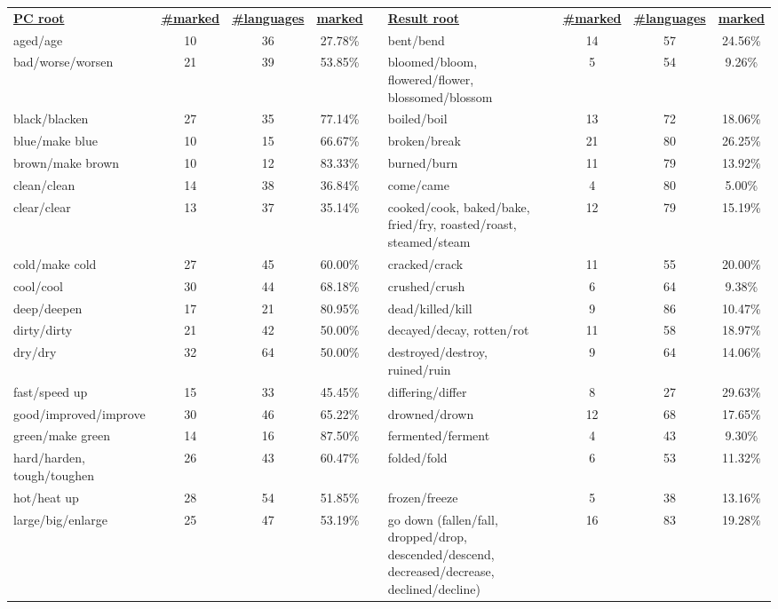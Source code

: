\begin{tabular}{p{3cm}ccccp{3cm}ccc}
\underline{\textbf{PC root}} & \underline{\textbf{\#marked}} & \underline{\textbf{\#languages}} & \underline{\textbf{marked}} & & \underline{\textbf{Result root}} & \underline{\textbf{\#marked}} & \underline{\textbf{\#languages}} & \underline{\textbf{marked}} \\
aged/age & 10 & 36 & 27.78\% & & bent/bend & 14 & 57 & 24.56\% \\
bad/worse/worsen & 21 & 39 & 53.85\% & & bloomed/bloom, flowered/flower, blossomed/blossom & 5 & 54 & 9.26\% \\
black/blacken & 27 & 35 & 77.14\% & & boiled/boil & 13 & 72 & 18.06\% \\
blue/make blue & 10 & 15 & 66.67\% & & broken/break & 21 & 80 & 26.25\% \\
brown/make brown & 10 & 12 & 83.33\% & & burned/burn & 11 & 79 & 13.92\% \\
clean/clean & 14 & 38 & 36.84\% & & come/came & 4 & 80 & 5.00\% \\
clear/clear & 13 & 37 & 35.14\% & & cooked/cook, baked/bake, fried/fry, roasted/roast, steamed/steam & 12 & 79 & 15.19\% \\
cold/make cold & 27 & 45 & 60.00\% & & cracked/crack & 11 & 55 & 20.00\% \\
cool/cool & 30 & 44 & 68.18\% & & crushed/crush & 6 & 64 & 9.38\% \\
deep/deepen & 17 & 21 & 80.95\% & & dead/killed/kill & 9 & 86 & 10.47\% \\
dirty/dirty & 21 & 42 & 50.00\% & & decayed/decay, rotten/rot & 11 & 58 & 18.97\% \\
dry/dry & 32 & 64 & 50.00\% & & destroyed/destroy, ruined/ruin & 9 & 64 & 14.06\% \\
fast/speed up & 15 & 33 & 45.45\% & & differing/differ & 8 & 27 & 29.63\% \\
good/improved/improve & 30 & 46 & 65.22\% & & drowned/drown & 12 & 68 & 17.65\% \\
green/make green & 14 & 16 & 87.50\% & & fermented/ferment & 4 & 43 & 9.30\% \\
hard/harden, tough/toughen & 26 & 43 & 60.47\% & & folded/fold & 6 & 53 & 11.32\% \\
hot/heat up & 28 & 54 & 51.85\% & & frozen/freeze & 5 & 38 & 13.16\% \\
large/big/enlarge & 25 & 47 & 53.19\% & & go down (fallen/fall, dropped/drop, descended/descend, decreased/decrease, declined/decline) & 16 & 83 & 19.28\% \\

\end{tabular}
